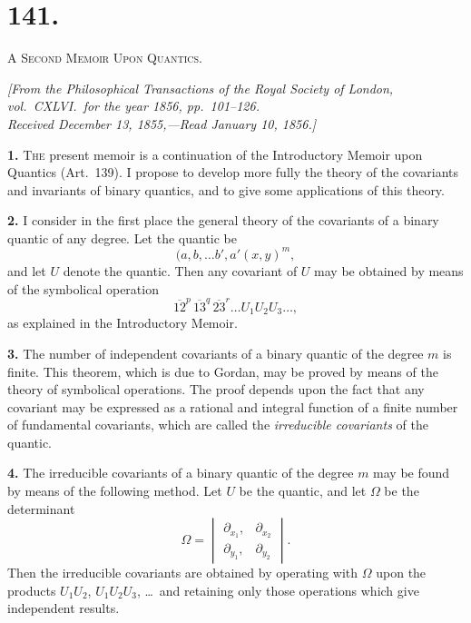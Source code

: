 \documentclass[12pt,a4paper]{article}
\begin{document}

\section*{141.}

\textsc{A Second Memoir Upon Quantics.}

\begin{flushright}
\textit{[From the Philosophical Transactions of the Royal Society of London,}\\
\textit{vol.\ CXLVI.\ for the year 1856, pp.\ 101--126.}\\
\textit{Received December 13, 1855,---Read January 10, 1856.]}
\end{flushright}

\textbf{1.} \textsc{The} present memoir is a continuation of the Introductory Memoir upon Quantics (Art.\ 139). I propose to develop more fully the theory of the covariants and invariants of binary quantics, and to give some applications of this theory.

\textbf{2.} I consider in the first place the general theory of the covariants of a binary quantic of any degree. Let the quantic be
\[
(a, b, \ldots b', a' \!\!\!\!\!(x, y)^m,
\]
and let $U$ denote the quantic. Then any covariant of $U$ may be obtained by means of the symbolical operation
\[
\overline{12}^p \, \overline{13}^q \, \overline{23}^r \ldots U_1 U_2 U_3 \ldots,
\]
as explained in the Introductory Memoir.

\newpage
\setcounter{page}{247}

\textbf{3.} The number of independent covariants of a binary quantic of the degree $m$ is finite. This theorem, which is due to Gordan, may be proved by means of the theory of symbolical operations. The proof depends upon the fact that any covariant may be expressed as a rational and integral function of a finite number of fundamental covariants, which are called the \textit{irreducible covariants} of the quantic.

\textbf{4.} The irreducible covariants of a binary quantic of the degree $m$ may be found by means of the following method. Let $U$ be the quantic, and let $\Omega$ be the determinant
\[
\Omega = \begin{vmatrix}
\partial_{x_1}, & \partial_{x_2} \\
\partial_{y_1}, & \partial_{y_2}
\end{vmatrix}.
\]
Then the irreducible covariants are obtained by operating with $\Omega$ upon the products $U_1 U_2$, $U_1 U_2 U_3$, \ldots\ and retaining only those operations which give independent results.
\end{document}

